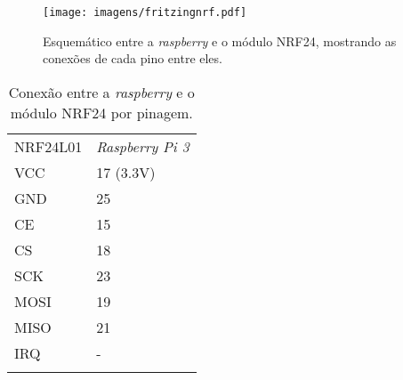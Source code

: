     \begin{figure}[H]
    \centering
    \texttt{[image: imagens/fritzingnrf.pdf]}
    \caption{Esquemático entre a \emph{raspberry} e o módulo NRF24, mostrando as conexões de cada pino entre eles.}
    \label{fritizingnrf}
\end{figure}

    
  \begin{table}[h]
 \centering
 {\renewcommand\arraystretch{1.25}
 \caption{Conexão entre a \emph{raspberry} e o módulo NRF24 por pinagem.}
 \begin{tabular}{ l l }
  \cline{1-1}\cline{2-2}  
    \multicolumn{1}{|p{3.850cm}|}{NRF24L01 \centering } &
    \multicolumn{1}{p{4.217cm}|}{\emph{Raspberry Pi 3} \centering }
  \\  
  \cline{1-1}\cline{2-2}  
    \multicolumn{1}{|p{3.850cm}|}{VCC \centering } &
    \multicolumn{1}{p{4.217cm}|}{17 (3.3V) \centering }
  \\  
  \cline{1-1}\cline{2-2}  
    \multicolumn{1}{|p{3.850cm}|}{GND \centering } &
    \multicolumn{1}{p{4.217cm}|}{25  \centering }
  \\  
  \cline{1-1}\cline{2-2}  
    \multicolumn{1}{|p{3.850cm}|}{CE \centering } &
    \multicolumn{1}{p{4.217cm}|}{15 \centering }
  \\  
  \cline{1-1}\cline{2-2}  
    \multicolumn{1}{|p{3.850cm}|}{CS \centering } &
    \multicolumn{1}{p{4.217cm}|}{18 \centering }
  \\  
  \cline{1-1}\cline{2-2}  
    \multicolumn{1}{|p{3.850cm}|}{SCK \centering } &
    \multicolumn{1}{p{4.217cm}|}{23 \centering }
  \\  
  \cline{1-1}\cline{2-2}  
    \multicolumn{1}{|p{3.850cm}|}{MOSI \centering } &
    \multicolumn{1}{p{4.217cm}|}{19 \centering }
  \\  
  \cline{1-1}\cline{2-2}  
    \multicolumn{1}{|p{3.850cm}|}{MISO \centering } &
    \multicolumn{1}{p{4.217cm}|}{21 \centering }
  \\  
  \cline{1-1}\cline{2-2}  
    \multicolumn{1}{|p{3.850cm}|}{IRQ \centering } &
    \multicolumn{1}{p{4.217cm}|}{- \centering }
  \\  
  \hline
\label{tabelanrf}
 \end{tabular} }
\end{table}  


